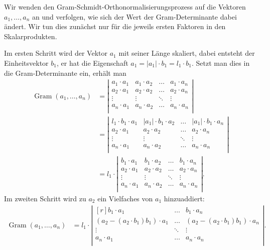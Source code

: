 Wir wenden den Gram-Schmidt-Orthonormalisierungsprozess auf die Vektoren
$a_1,\dots,a_n$ an und verfolgen, wie sich der Wert der Gram-Determinante
dabei ändert.
%
Wir tun dies zunächst nur für die jeweils ersten Faktoren in den 
Skalarprodukten.

Im ersten Schritt wird der Vektor $a_1$ mit seiner Länge skaliert, 
dabei entsteht der Einheitsvektor $b_1$, er hat die Eigenschaft
$a_1=|a_1|\cdot b_1 = l_1\cdot b_1$.
Setzt man dies in die Gram-Determinante ein, erhält man
\begin{align*}
\operatorname{Gram}(a_1,\dots,a_n)
&=
\left|
\begin{matrix}
a_1\cdot a_1& a_1\cdot a_2&\dots  &a_1\cdot a_n\\
a_2\cdot a_1& a_2\cdot a_2&\dots  &a_2\cdot a_n\\
\vdots      &\vdots       &\ddots &\vdots      \\
a_n\cdot a_1& a_n\cdot a_2&\dots  &a_n\cdot a_n\\
\end{matrix}
\right|
\\
&=
\left|
\begin{matrix}
l_1
\cdot b_1\cdot a_1& |a_1|\cdot b_1\cdot a_2&\dots  &|a_1|\cdot b_1\cdot a_n\\
a_2\cdot a_1& a_2\cdot a_2&\dots  &a_2\cdot a_n\\
\vdots      &\vdots       &\ddots &\vdots      \\
a_n\cdot a_1& a_n\cdot a_2&\dots  &a_n\cdot a_n\\
\end{matrix}
\right|
\\
&=
l_1 \cdot
\left|
\begin{matrix}
b_1\cdot a_1& b_1\cdot a_2&\dots  &b_1\cdot a_n\\
a_2\cdot a_1& a_2\cdot a_2&\dots  &a_2\cdot a_n\\
\vdots      &\vdots       &\ddots &\vdots      \\
a_n\cdot a_1& a_n\cdot a_2&\dots  &a_n\cdot a_n\\
\end{matrix}
\right|.
\end{align*}
Im zweiten Schritt wird zu $a_2$ ein Vielfaches von $a_1$ 
hinzuaddiert:
\begin{align*}
\operatorname{Gram}(a_1,\dots,a_n)
&=
l_1\cdot
\left|
\begin{matrix*}[r]
b_1\cdot a_1
		&\dots  &b_1\cdot a_n\\
(a_2-(a_2\cdot b_1)b_1)\cdot a_1
		&\dots  &(a_2-(a_2\cdot b_1)b_1)\cdot a_n\\
\vdots \phantom{\;a_2}
		&\ddots &\vdots     \phantom{\;a_n} \\
a_n \cdot a_1
		&\dots  &a_n\cdot a_n\\
\end{matrix*}
\right|.
\end{align*}
